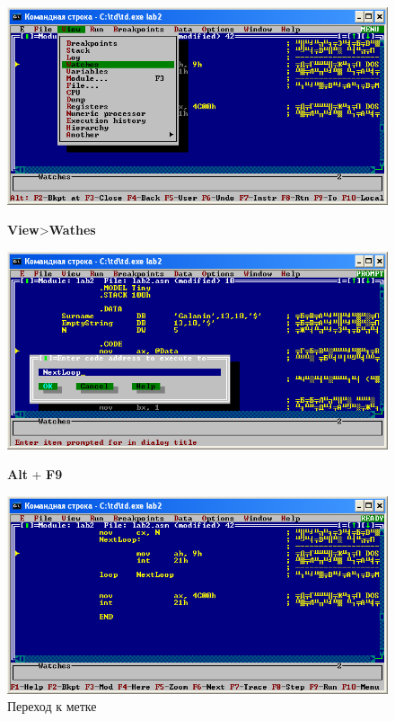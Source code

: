\begin{figure}[!htp]
    \centering
    \begin{minipage}{0.32\textwidth}
        \centering
        \includegraphics[width=.99\linewidth]
            {../_INCLUDES/task-4-9/td-View-Watches.png}
        \caption{\textbf{View}>\textbf{Wathes}}
        \label{fig:task_4_9__View_Watches}
    \end{minipage}
    \begin {minipage}{0.32\textwidth}
        \centering
        \includegraphics[width=.99\linewidth]
            {../_INCLUDES/task-4-9/td-Alt-F9.png}
        \caption{\textbf{Alt} + \textbf{F9}}
        \label{fig:task_4_9__Alt_F9}
    \end{minipage}
    \begin {minipage}{0.32\textwidth}
        \centering
        \includegraphics[width=.99\linewidth]
            {../_INCLUDES/task-4-9/td-Alt-F9-result.png}
        \caption{Переход к метке}
        \label{fig:task_4_9__Alt_F9_result}
    \end{minipage}
\end{figure}


